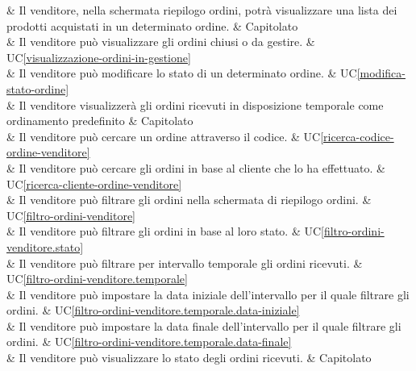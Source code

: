  & Il venditore, nella schermata riepilogo ordini, potrà visualizzare una lista dei prodotti acquistati in un determinato ordine. & Capitolato \\

 & Il venditore può visualizzare gli ordini chiusi o da gestire. & UC\ref{visualizzazione-ordini-in-gestione} \\
    
 & Il venditore può modificare lo stato di un determinato ordine. & UC\ref{modifica-stato-ordine} \\

 & Il venditore visualizzerà gli ordini ricevuti in disposizione temporale come ordinamento predefinito & Capitolato \\

 & Il venditore può cercare un ordine attraverso il codice. & UC\ref{ricerca-codice-ordine-venditore} \\
     
 & Il venditore può cercare gli ordini in base al cliente che lo ha effettuato. & UC\ref{ricerca-cliente-ordine-venditore} \\
    
 & Il venditore può filtrare gli ordini nella schermata di riepilogo ordini. & UC\ref{filtro-ordini-venditore} \\
    
 & Il venditore può filtrare gli ordini in base al loro stato. & UC\ref{filtro-ordini-venditore.stato} \\
    
 & Il venditore può filtrare per intervallo temporale gli ordini ricevuti. & UC\ref{filtro-ordini-venditore.temporale} \\
    
 & Il venditore può impostare la data iniziale dell'intervallo per il quale filtrare gli ordini. & UC\ref{filtro-ordini-venditore.temporale.data-iniziale} \\
    
 & Il venditore può impostare la data finale dell'intervallo per il quale filtrare gli ordini. & UC\ref{filtro-ordini-venditore.temporale.data-finale} \\

 & Il venditore può visualizzare lo stato degli ordini ricevuti. & Capitolato \\ 
